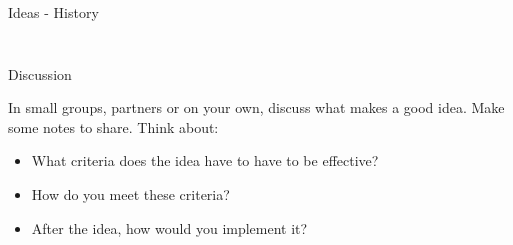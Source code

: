 \documentclass[10pt]{beamer}
\begin{document}
\begin{frame}{Ideas - History}
{\begin{columns}
\begin{column}{0.3333\textwidth}
\begin{figure}[h]
					\caption*{}
				\end{figure}
			\end{column}
		\end{columns}
	}
\end{frame}

\begin{frame}{Discussion}
	\begin{tcolorbox}[title=Discussion (15 mins)]
		In small groups, partners or on your own, discuss what makes a good idea. Make some notes to share.
		\tcblower
		Think about: 
		\begin{itemize}
			\item What criteria does the idea have to have to be effective? 
			\item How do you meet these criteria? 
			\item After the idea, how would you implement it?
		\end{itemize}
	\end{tcolorbox}
\end{frame}
\end{document}
